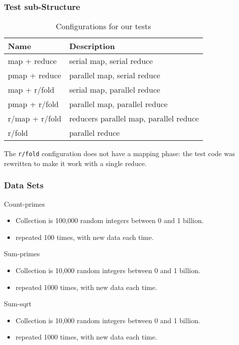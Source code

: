 \documentclass{beamer}
\newcommand{\clocode}[1]{{\texttt {#1}}}
\begin{document}
\begin{frame}
\frametitle{Test sub-Structure}
\begin{table}
\begin{center}
\begin{tabular}{|l|l|}
\hline 
Name & Description \\
\hline
map + reduce & serial map, serial reduce \\
pmap + reduce & parallel map, serial reduce \\
map + r/fold & serial map, parallel reduce \\
pmap + r/fold & parallel map, parallel reduce\\
r/map + r/fold & reducers parallel map, parallel reduce\\
r/fold & parallel reduce\\
\hline
\end{tabular}
\end{center}
\caption{Configurations for our tests}\label{table:tests}
\end{table}
The \clocode{r/fold} configuration does not have a mapping phase: the test code was rewritten to make it work with a single reduce.
\end{frame}

\begin{frame}
\frametitle{Data Sets}
Count-primes
	\begin{itemize}
	\item Collection is 100,000 random integers between 0 and 1 billion.
	\item repeated 100 times, with new data each time. 
	\end{itemize}
Sum-primes
	\begin{itemize}
	\item Collection is 10,000 random integers  between 0 and 1 billion.
	\item repeated 1000 times, with new data each time. 
	\end{itemize}
Sum-sqrt
	\begin{itemize}
	\item Collection is 10,000 random integers  between 0 and 1 billion.
	\item repeated 1000 times, with new data each time. 
	\end{itemize}
\end{frame}
\end{document}
